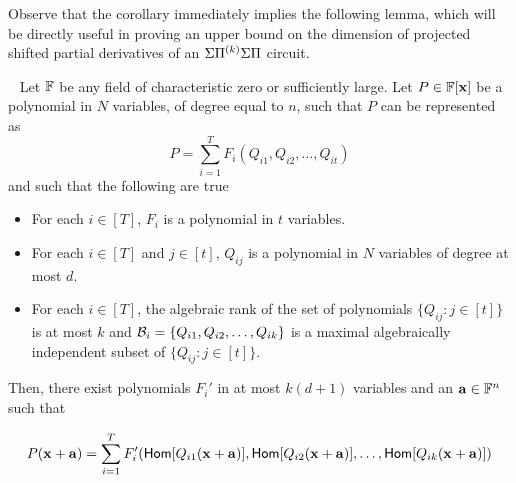 

Observe that the corollary immediately implies the following lemma,  which will be directly useful in proving an upper bound on the dimension of projected shifted partial derivatives of an $\Sigma{\Pi^{(k)}}\Sigma\Pi$ circuit.  
\begin{lemma}~\label{lem:expressing as functions of the basis}
Let $\mathbb{F}$ be any  field of characteristic zero or sufficiently large. Let $P \in \mathbb{F}[\mathbf{x}]$ be a polynomial in $N$ variables, of degree equal to $n$, such that  $P$ can be represented as $$P = \sum_{i = 1}^T  F_{i}(Q_{i1}, Q_{i2}, \ldots, Q_{it})    $$
and such that the following are true
\begin{itemize}
\item For each $i \in[T]$, $F_i$ is a polynomial in $t$ variables. 
\item For each $i \in [T]$ and $j \in [t]$, $Q_{ij}$ is a polynomial in $N$ variables of degree at most $d$. 
\item For each $i \in [T]$, the algebraic rank of the set of polynomials $\{Q_{ij} : j \in [t]\}$ is at most $k$ and  ${\cal B}_i = \{Q_{i1}, Q_{i2}, \ldots, Q_{ik}\}$ is a maximal algebraically independent subset of $\{Q_{ij} : j \in [t]\}$. 
\end{itemize}
Then, there exist polynomials $F_i'$ in at most $k(d+1)$ variables and an $\mathbf{a} \in \mathbb{F}^n$ such that 

\begin{multline}
P(\mathbf{x} + \mathbf{a}) = \sum_{i = 1}^T  F_i'(\mathsf{Hom}[Q_{i1}(\mathbf{x} + \mathbf{a})], \mathsf{Hom}[Q_{i2}(\mathbf{x} + \mathbf{a})], \ldots, \mathsf{Hom}[Q_{ik}(\mathbf{x} + \mathbf{a})])
\end{multline}
\end{lemma}

